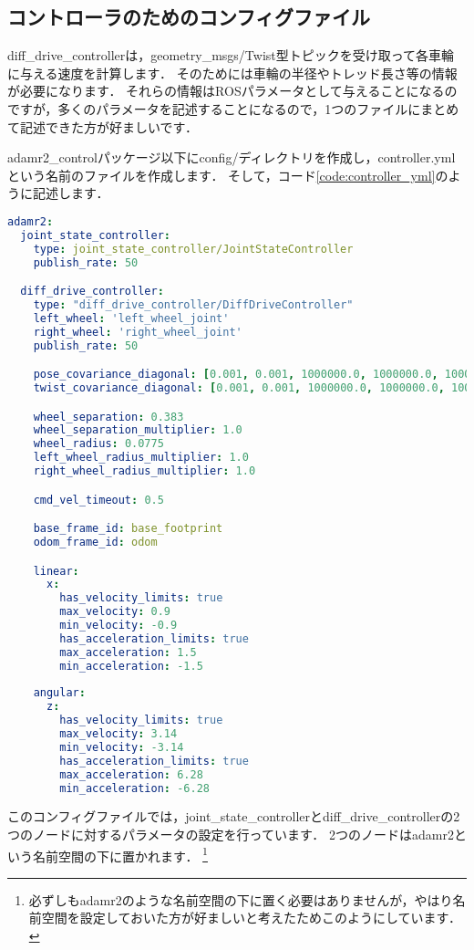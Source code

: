 \documentclass[{../../master}]{subfiles}
\begin{document}
\subsection{コントローラのためのコンフィグファイル}
\label{sec:config_for_diff_drive_controller}

\textsf{diff\_drive\_controller}は，\textsf{geometry\_msgs/Twist}型トピックを受け取って各車輪に与える速度を計算します．
そのためには車輪の半径やトレッド長さ等の情報が必要になります．
それらの情報はROSパラメータとして与えることになるのですが，多くのパラメータを記述することになるので，1つのファイルにまとめて記述できた方が好ましいです．

\textsf{adamr2\_control}パッケージ以下に\textsf{config/}ディレクトリを作成し，\textsf{controller.yml}という名前のファイルを作成します．
そして，コード\ref{code:controller_yml}のように記述します．

\begin{lstlisting}[language=YAML, label=code:controller_yml, caption=\textsf{controller.yml}]
adamr2:
  joint_state_controller:
    type: joint_state_controller/JointStateController
    publish_rate: 50

  diff_drive_controller:
    type: "diff_drive_controller/DiffDriveController"
    left_wheel: 'left_wheel_joint'
    right_wheel: 'right_wheel_joint'
    publish_rate: 50

    pose_covariance_diagonal: [0.001, 0.001, 1000000.0, 1000000.0, 1000000.0, 10.0]
    twist_covariance_diagonal: [0.001, 0.001, 1000000.0, 1000000.0, 1000000.0, 10.0]

    wheel_separation: 0.383
    wheel_separation_multiplier: 1.0
    wheel_radius: 0.0775
    left_wheel_radius_multiplier: 1.0
    right_wheel_radius_multiplier: 1.0

    cmd_vel_timeout: 0.5

    base_frame_id: base_footprint
    odom_frame_id: odom

    linear:
      x:
        has_velocity_limits: true
        max_velocity: 0.9
        min_velocity: -0.9
        has_acceleration_limits: true
        max_acceleration: 1.5
        min_acceleration: -1.5
      
    angular:
      z:
        has_velocity_limits: true
        max_velocity: 3.14
        min_velocity: -3.14
        has_acceleration_limits: true
        max_acceleration: 6.28
        min_acceleration: -6.28
\end{lstlisting}

このコンフィグファイルでは，\textsf{joint\_state\_controller}と\textsf{diff\_drive\_controller}の2つのノードに対するパラメータの設定を行っています．
2つのノードは\textsf{adamr2}という名前空間の下に置かれます．
\footnote{必ずしも\textsf{adamr2}のような名前空間の下に置く必要はありませんが，やはり名前空間を設定しておいた方が好ましいと考えたためこのようにしています．}
\end{document}
